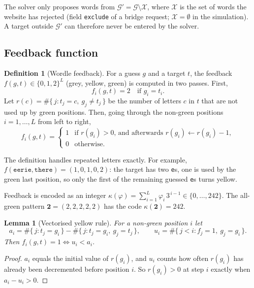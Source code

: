 \documentclass[11pt,a4paper]{article}
\newtheorem{lemma}{Lemma}
\theoremstyle{definition}
\newtheorem{definition}{Definition}
\theoremstyle{remark}
\newcommand{\G}{\mathcal{G}}
\newcommand{\X}{\mathcal{X}}
\newcommand{\green}{\mathbf{2}}
\begin{document}
The solver only proposes words from $\G' = \G \setminus \X$, where $\X$ is the set of
words the website has rejected (field \texttt{exclude} of a bridge request; $\X=\emptyset$
in the simulation). A target outside $\G'$ can therefore never be entered by the solver.

\subsection{Feedback function}

\begin{definition}[Wordle feedback]
For a guess $g$ and a target $t$, the feedback $f(g,t) \in \{0,1,2\}^L$
(grey, yellow, green) is computed in two passes. First,
\[
  f_i(g,t) = 2 \quad\text{if } g_i = t_i .
\]
Let $r(c) = \#\{\, j : t_j = c,\ g_j \neq t_j \,\}$ be the number of letters $c$
in $t$ that are not used up by green positions. Then, going through the
non-green positions $i = 1,\dots,L$ from left to right,
\[
  f_i(g,t) =
  \begin{cases}
    1 & \text{if } r(g_i) > 0 \text{, and afterwards } r(g_i) \gets r(g_i)-1,\\
    0 & \text{otherwise.}
  \end{cases}
\]
\end{definition}

The definition handles repeated letters exactly. For example,
$f(\texttt{eerie},\texttt{there}) = (1,0,1,0,2)$:
the target has two \texttt{e}s, one is used by the green last position,
so only the first of the remaining guessed \texttt{e}s turns yellow.

Feedback is encoded as an integer $\kappa(\varphi) = \sum_{i=1}^{L} \varphi_i\, 3^{\,i-1}
\in \{0,\dots,242\}$. The all-green pattern
$\green = (2,2,2,2,2)$ has the code $\kappa(\green) = 242$.

\begin{lemma}[Vectorised yellow rule]
\label{lem:vector}
For a non-green position $i$ let
\[
  a_i = \#\{\, j : t_j = g_i \,\} - \#\{\, j : t_j = g_i,\ g_j = t_j \,\},
  \qquad
  u_i = \#\{\, j < i : f_j = 1,\ g_j = g_i \,\}.
\]
Then $f_i(g,t) = 1 \iff u_i < a_i$.
\end{lemma}

\begin{proof}
$a_i$ equals the initial value of $r(g_i)$, and $u_i$ counts how often
$r(g_i)$ has already been decremented before position $i$.
So $r(g_i) > 0$ at step $i$ exactly when $a_i - u_i > 0$.
\end{proof}
\end{document}

